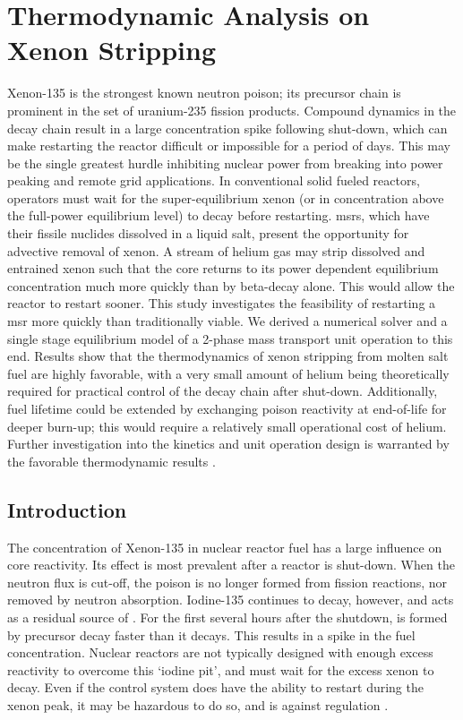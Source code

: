 \chapter{Thermodynamic Analysis on Xenon Stripping}
\label{Chapter:Xenon}

Xenon-135 is the strongest known neutron poison; its precursor chain is prominent in the set of uranium-235 fission products. Compound dynamics in the decay chain result in a large \Xe concentration spike following shut-down, which can make restarting the reactor difficult or impossible for a period of days. This may be the single greatest hurdle inhibiting nuclear power from breaking into power peaking and remote grid applications. In conventional solid fueled reactors, operators must wait for the super-equilibrium xenon (or \Xe in concentration above the full-power equilibrium level) to decay before restarting. \acfp{msr}, which have their fissile nuclides dissolved in a liquid salt, present the opportunity for advective removal of xenon. A stream of helium gas may strip dissolved and entrained xenon such that the core returns to its power dependent equilibrium \Xe concentration much more quickly than by beta-decay alone. This would allow the reactor to restart sooner. This study investigates the feasibility of restarting a \acs{msr} more quickly than traditionally viable. We derived a numerical solver and a single stage equilibrium model of a 2-phase mass transport unit operation to this end. Results show that the thermodynamics of xenon stripping from molten salt fuel are highly favorable, with a very small amount of helium being theoretically required for practical control of the \Xe decay chain after shut-down. Additionally, fuel lifetime could be extended by exchanging poison reactivity at end-of-life for deeper burn-up; this would require a relatively small operational cost of helium. Further investigation into the kinetics and unit operation design is warranted by the favorable thermodynamic results \cite{RootXe}.

\section{Introduction} \label{sec-intro}
The concentration of Xenon-135 in nuclear reactor fuel  has a large influence on core reactivity. Its effect is most prevalent after a reactor is shut-down. When the neutron flux is cut-off, the poison is no longer formed from fission reactions, nor removed by neutron absorption. Iodine-135 continues to decay, however, and acts as a residual source of \Xe. For the first several hours after the shutdown, \Xe is formed by precursor decay faster than it decays. This results in a spike in the fuel \Xe concentration. Nuclear reactors are not typically designed with enough excess reactivity to overcome this `iodine pit', and must wait for the excess xenon to decay.  Even if the control system does have the ability to restart during the xenon peak, it may be hazardous to do so, and is against regulation \cite{ChernobylNRC,CFR}.


